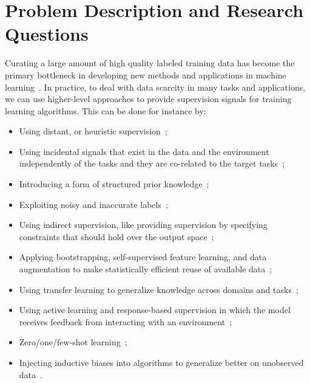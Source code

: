\section{Problem Description and Research Questions}
Curating a large amount of high quality labeled training data has become the primary bottleneck in developing new methods and applications in machine learning~\citep{Ratner:2016}. 
In practice, to deal with data scarcity in many tasks and applications, we can use higher-level approaches to provide supervision signals for training learning algorithms. 
This can be done for instance by:
\begin{itemize}
\setlength\itemsep{0em}
\item 
Using distant, or heuristic supervision~\citep{Ratner:2016,Deriu2016:SemEval,Severyn:2015:SemEval, Dehghani:2016:SIGIR, dehghani:2018:ICLR, Dehghani:2017:nips_metalearn, Ratner:2016,Rekatsinas:2017,Varma:2017};
%
\item
Using incidental signals that exist in the data and the environment independently of the tasks and they are co-related to the target tasks~\citep{roth2017incidental}; 
%
\item
Introducing a form of structured prior knowledge~\citep{Dehghani:CIKM2016:long,Dehghani:2016:ICTIR};
%
\item
Exploiting noisy and inaccurate labels~\citep{Vahdat:2017, Lee:2013,Hinton:2015,Brodley:1999,reed2014training, Patrini:2016, patrini2016loss,malach2017decoupling,Ratner:2016};
%
\item
Using indirect supervision, like providing supervision by specifying constraints that should hold over the output space~\citep{stewart2017label, clarke2010driving};
%
\item
Applying bootstrapping, self-supervised feature learning, and data augmentation to make statistically efficient reuse of available data~\citep{cubuk2018autoaugment, miyato2018virtual, Qizhe:2019:uda, dosovitskiy2016discriminative,donahue2016adversarial};
%
\item
Using transfer learning to generalize knowledge across domains and tasks~\citep{Ruder:2019};
%
\item
Using active learning and response-based supervision in which the model receives feedback from interacting with an environment~\citep{clarke2010driving,riezler2014response};
%
\item
Zero/one/few-shot learning~\citep{vinyals2016matching,finn2017model,snell2017prototypical,socher2013zero};
%
\item
Injecting inductive biases into algorithms to generalize better on unobserved data~\citep{cohen2016group, cohen2016steerable, Dehghani:ICLR:2019}.
\end{itemize}

